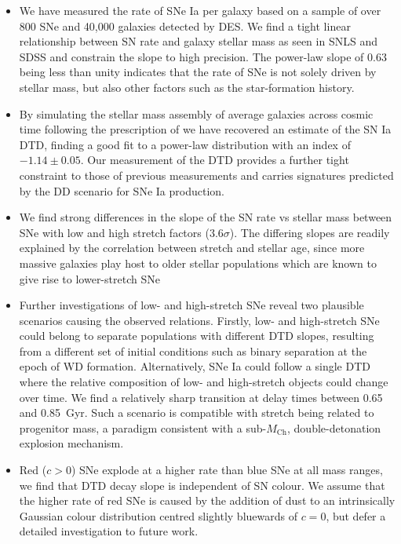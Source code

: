 \documentclass[fleqn,usenatbib]{mnras}
\begin{document}
\begin{itemize}
\item We have measured the rate of SNe Ia per galaxy based on a sample of over 800 SNe and 40,000 galaxies detected by DES. We find a tight linear relationship between SN rate and galaxy stellar mass as seen in SNLS \citep{Sullivan2006} and SDSS \citep{Smith2012} and constrain the slope to high precision. The power-law slope of 0.63 being less than unity indicates that the rate of SNe is not solely driven by stellar mass, but also other factors such as the star-formation history.
    
\item By simulating the stellar mass assembly of average galaxies across cosmic time following the prescription of  we have recovered an estimate of the SN Ia DTD, finding a good fit to a power-law distribution with an index of $-1.14 \pm0.05$. Our measurement of the DTD provides a further tight constraint to those of previous measurements \citep[e.g.][]{Graur2013,Maoz2017} and carries signatures predicted by the DD scenario for SNe Ia production.
    
\item We find strong differences in the slope of the SN rate vs stellar mass between SNe with low and high stretch factors ($3.6\sigma$). The differing slopes are readily explained by the correlation between stretch and stellar age, since more massive galaxies play host to older stellar populations which are known to give rise to lower-stretch SNe
    
\item Further investigations of low- and high-stretch SNe reveal two plausible scenarios causing the observed relations. Firstly, low- and high-stretch SNe could belong to separate populations with different DTD slopes, resulting from a different set of initial conditions such as binary separation at the epoch of WD formation. Alternatively, SNe Ia could follow a single DTD where the relative composition of low- and high-stretch objects could change over time. We find a relatively sharp transition at delay times between 0.65 and 0.85~Gyr. Such a scenario is compatible with stretch being related to progenitor mass, a paradigm consistent with a sub-$M_{\mathrm{Ch}}$, double-detonation explosion mechanism. 

\item Red ($c>0$) SNe explode at a higher rate than blue SNe at all mass ranges, we find that DTD decay slope is independent of SN colour. We assume that the higher rate of red SNe is caused by the addition of dust to an intrinsically Gaussian colour distribution centred slightly bluewards of $c=0$, but defer a detailed investigation to future work.
\end{itemize}
\end{document}
